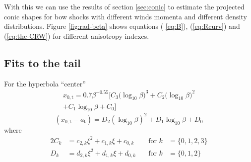 
With this we can use the results of section \ref{sec:conic} to estimate the projected conic shapes for bow shocks with different winds 
momenta and different density distributions. Figure \ref{fig:rad-beta} shows equations ( \ref{eq:B}), (\ref{eq:Rcurv}) and (\ref{eq:thc-CRW}) for different anisotropy indexes. 


\subsection{Fits to the tail}
\label{sec:fits-tail}


For the hyperbola ``center''
\begin{multline}
  \label{eq:tail-analytic-x0}
  x_{0,\mathrm{t}} = 0.7 \beta^{-0.55} \biggl[
    C_3 \bigl(\log_{10}\beta\bigr)^3 + C_2 \bigl(\log_{10}\beta\bigr)^2 
  \\ + C_1 \log_{10}\beta + C_0
  \biggr]
\end{multline}
\begin{equation}
  \label{eq:tail-analytic-x0-minus-a}
  (x_{0,\mathrm{t}} - a_{\mathrm{t}}) = D_2 (\log_{10}\beta)^2 + D_1 \log_{10}\beta + D_0
\end{equation}
where
\begin{alignat}{2}
  C_k &= c_{2,k} \xi^2 + c_{1,k} \xi + c_{0,k} &\quad \text{for\ } k &= \{0, 1, 2, 3\} \\
  D_k &= d_{2,k} \xi^2 + d_{1,k} \xi + d_{0,k} &\quad \text{for\ } k &= \{0, 1, 2\} \\
  \label{eq:tail-analytic-coeffs}
\end{alignat}


\newcommand\iso{\ensuremath{^{\mathrm{iso}}}}

